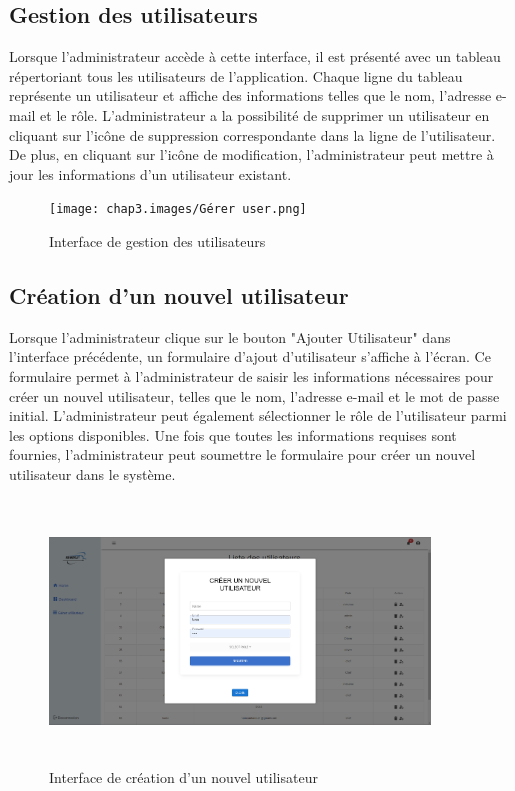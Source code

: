 \newpage
\subsection{Gestion des utilisateurs}
Lorsque l'administrateur accède à cette interface, il est présenté avec un tableau répertoriant tous les utilisateurs de l'application. Chaque ligne du tableau représente un utilisateur et affiche des informations telles que le nom, l'adresse e-mail et le rôle. L'administrateur a la possibilité de supprimer un utilisateur en cliquant sur l'icône de suppression correspondante dans la ligne de l'utilisateur. De plus, en cliquant sur l'icône de modification, l'administrateur peut mettre à jour les informations d'un utilisateur existant.
\bigskip

\begin{figure}[ht!]
  \centering
  \texttt{[image: chap3.images/Gérer user.png]}
  \caption{Interface de gestion des utilisateurs}

\end{figure}


\subsection{Création d'un nouvel utilisateur}
Lorsque l'administrateur clique sur le bouton "Ajouter Utilisateur" dans l'interface précédente, un formulaire d'ajout d'utilisateur s'affiche à l'écran. Ce formulaire permet à l'administrateur de saisir les informations nécessaires pour créer un nouvel utilisateur, telles que le nom, l'adresse e-mail et le mot de passe initial. L'administrateur peut également sélectionner le rôle de l'utilisateur parmi les options disponibles. Une fois que toutes les informations requises sont fournies, l'administrateur peut soumettre le formulaire pour créer un nouvel utilisateur dans le système.\\

\newpage
\begin{figure}[ht!]
  \centering
  \includegraphics[width=0.9\textwidth,height=7cm]{chap3.images/creer user.png}
  \caption{Interface de création d'un nouvel utilisateur}

\end{figure}
